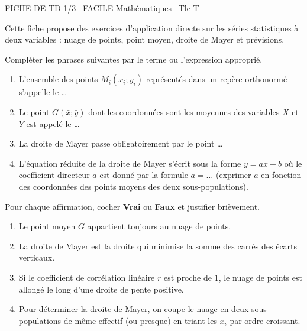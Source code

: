 \documentclass[11pt]{article}
\begin{document}
\begin{tcolorbox}[enhanced,colback=popink,colframe=popink,arc=10pt,boxrule=0pt,left=12pt,right=12pt,top=9pt,bottom=9pt]
{\color{white}\popxbold\small FICHE DE TD 1/3 \textbullet\ FACILE \hfill Mathématiques \textbullet\ Tle T\par}
\end{tcolorbox}
\vspace{4pt}
Cette fiche propose des exercices d'application directe sur les séries statistiques à deux variables : nuage de points, point moyen, droite de Mayer et prévisions.

\begin{exercice}
Compléter les phrases suivantes par le terme ou l'expression approprié.
\begin{enumerate}
    \item L'ensemble des points $M_i(x_i ; y_i)$ représentés dans un repère orthonormé s'appelle le \ldots
    \item Le point $G(\bar{x} ; \bar{y})$ dont les coordonnées sont les moyennes des variables $X$ et $Y$ est appelé le \ldots
    \item La droite de Mayer passe obligatoirement par le point \ldots
    \item L'équation réduite de la droite de Mayer s'écrit sous la forme $y = ax + b$ où le coefficient directeur $a$ est donné par la formule $a = \ldots$ (exprimer $a$ en fonction des coordonnées des points moyens des deux sous-populations).
\end{enumerate}
\end{exercice}

\begin{exercice}
Pour chaque affirmation, cocher \textbf{Vrai} ou \textbf{Faux} et justifier brièvement.
\begin{enumerate}
    \item Le point moyen $G$ appartient toujours au nuage de points.
    \item La droite de Mayer est la droite qui minimise la somme des carrés des écarts verticaux.
    \item Si le coefficient de corrélation linéaire $r$ est proche de $1$, le nuage de points est allongé le long d'une droite de pente positive.
    \item Pour déterminer la droite de Mayer, on coupe le nuage en deux sous-populations de même effectif (ou presque) en triant les $x_i$ par ordre croissant.
\end{enumerate}
\end{exercice}
\end{document}
